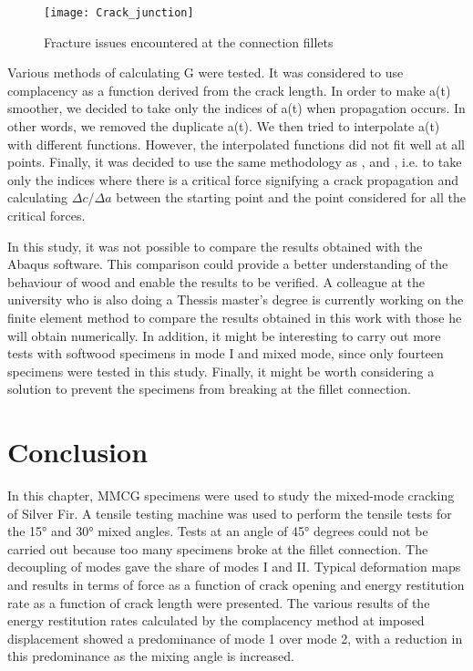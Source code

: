 \begin{figure}[htp]
	\centering
	\texttt{[image: Crack\_junction]}
	\caption{Fracture issues encountered at the connection fillets}
	\label{fig:Crack_junction}
\end{figure}

Various methods of calculating G were tested. It was considered to use complacency as a function derived from the crack length. In order to make a(t) smoother, we decided to take only the indices of a(t) when propagation occurs. In other words, we removed the duplicate a(t). We then tried to interpolate a(t) with different functions. However, the interpolated functions did not fit well at all points.
Finally, it was decided to use the same methodology as \cite{MoutouPitti2008}, \cite{Mambili2018} and  \cite{Odounga2018phd}, i.e. to take only the indices where there is a critical force signifying a crack propagation and calculating $\Delta c$/$\Delta a$ between the starting point and the point considered for all the critical forces.

In this study, it was not possible to compare the results obtained with the Abaqus software. This comparison could provide a better understanding of the behaviour of wood and enable the results to be verified. A colleague at the university who is also doing a Thessis master's degree is currently working on the finite element method to compare the results obtained in this work with those he will obtain numerically. In addition, it might be interesting to carry out more tests with softwood specimens in mode I and mixed mode, since only fourteen specimens were tested in this study.
Finally, it might be worth considering a solution to prevent the specimens from breaking at the fillet connection.

\section{Conclusion}

In this chapter, MMCG specimens were used to study the mixed-mode cracking of Silver Fir. A tensile testing machine was used to perform the tensile tests for the 15° and 30° mixed angles. Tests at an angle of 45° degrees could not be carried out because too many specimens broke at the fillet connection. The decoupling of modes gave the share of modes I and II.  Typical deformation maps and results in terms of force as a function of crack opening and energy restitution rate as a function of crack length were presented. The various results of the energy restitution rates calculated by the complacency method at imposed displacement showed a predominance of mode 1 over mode 2, with a reduction in this predominance as the mixing angle is increased.
